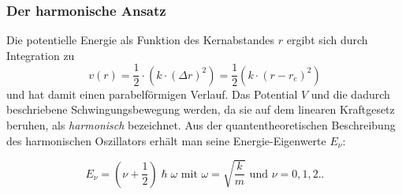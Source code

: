 \documentclass[12pt]{article}
\begin{document}
\subsubsection{Der harmonische Ansatz}
Die potentielle Energie als Funktion des Kernabstandes $r$ ergibt sich durch Integration zu
\begin{equation}
  v(r) = \frac{1}{2} \cdot (k \cdot (\Delta r)^2) = \frac{1}{2}(k \cdot (r -r_e)^2) 
\end{equation}
und hat damit einen parabelförmigen Verlauf. Das Potential $V$ und die dadurch beschriebene Schwingungsbewegung werden,
da sie auf dem linearen Kraftgesetz beruhen, als \textit{harmonisch} bezeichnet.
Aus der quantentheoretischen Beschreibung des \glqq harmonischen Oszillators \grqq erhält man seine Energie-Eigenwerte $E _{\nu}$:

\begin{equation}
      E _{\nu}= (\nu + \frac{1}{2}) \hslash \omega \, \, \text{mit } \omega=\sqrt{\frac{k}{m}} \,\, \text{und} \,\, \nu = 0, 1, 2 ..
\end{equation}
\end{document}

